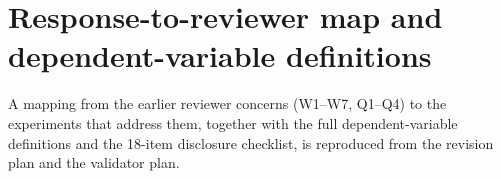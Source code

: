 \section{Response-to-reviewer map and dependent-variable definitions}
\label{app:dv}

A mapping from the earlier reviewer concerns (W1--W7, Q1--Q4) to the
experiments that address them, together with the full dependent-variable
definitions and the 18-item disclosure checklist, is reproduced from the
revision plan and the validator plan.

